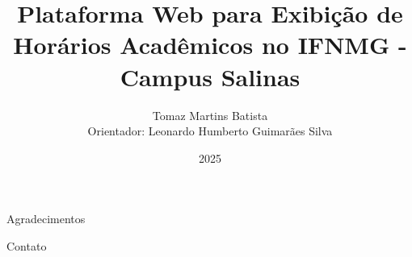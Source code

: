 \documentclass[handout,t]{beamer}
\title[Trabalho de Conclusão de Curso]{
	Plataforma Web para Exibição de Horários Acadêmicos no IFNMG - Campus Salinas}
\date{
	2025}
\author[Autor: Tomaz Martins Batista]{
	Tomaz Martins Batista\\
	Orientador: Leonardo Humberto Guimarães Silva\\
	\vspace{0.5cm}}
\institute[]{
	Bacharelado em Sistemas de informação\\
	Instituto Federal do Norte de Minas Gerais - Campus Salinas\\
	\vspace{0.5cm}}
\begin{document}
\frame{\titlepage}
\section[]{}









%



%

\section{}
\begin{frame}{Agradecimentos}

\end{frame}

\begin{frame}{Contato}

\end{frame}
\end{document}
